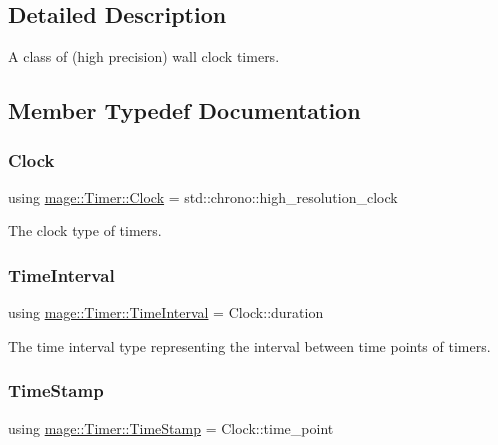 \subsection{Detailed Description}
A class of (high precision) wall clock timers. 

\subsection{Member Typedef Documentation}
\hypertarget{classmage_1_1_timer_a6d46c5edc40fd404d44d8762c814c5f3}{}\label{classmage_1_1_timer_a6d46c5edc40fd404d44d8762c814c5f3} 
\subsubsection{\texorpdfstring{Clock}{Clock}}
{\footnotesize\ttfamily using \hyperlink{classmage_1_1_timer_a6d46c5edc40fd404d44d8762c814c5f3}{mage\+::\+Timer\+::\+Clock} =  std\+::chrono\+::high\+\_\+resolution\+\_\+clock\hspace{0.3cm}{\ttfamily [private]}}

The clock type of timers. \hypertarget{classmage_1_1_timer_a5e38d0ad64043ad3622072e7b6637d98}{}\label{classmage_1_1_timer_a5e38d0ad64043ad3622072e7b6637d98} 
\subsubsection{\texorpdfstring{Time\+Interval}{TimeInterval}}
{\footnotesize\ttfamily using \hyperlink{classmage_1_1_timer_a5e38d0ad64043ad3622072e7b6637d98}{mage\+::\+Timer\+::\+Time\+Interval} =  Clock\+::duration\hspace{0.3cm}{\ttfamily [private]}}

The time interval type representing the interval between time points of timers. \hypertarget{classmage_1_1_timer_aff202783fe113efdf539f9dc685a158c}{}\label{classmage_1_1_timer_aff202783fe113efdf539f9dc685a158c} 
\subsubsection{\texorpdfstring{Time\+Stamp}{TimeStamp}}
{\footnotesize\ttfamily using \hyperlink{classmage_1_1_timer_aff202783fe113efdf539f9dc685a158c}{mage\+::\+Timer\+::\+Time\+Stamp} =  Clock\+::time\+\_\+point\hspace{0.3cm}{\ttfamily [private]}}

